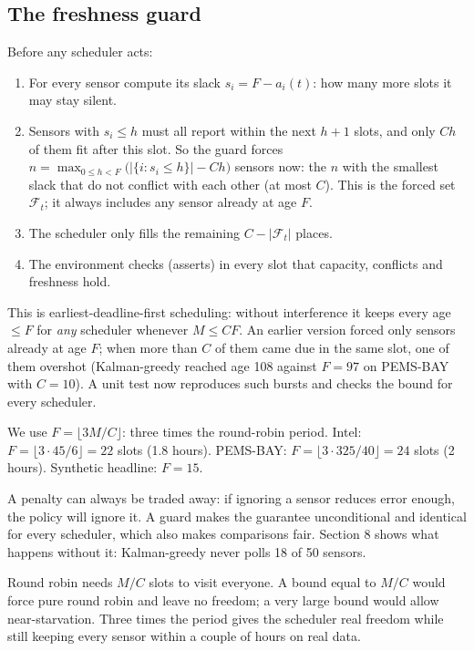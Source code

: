 \subsection{The freshness guard}

Before any scheduler acts:
\begin{enumerate}
  \item For every sensor compute its slack $s_i=F-a_i(t)$: how many more slots it may stay silent.
  \item Sensors with $s_i\le h$ must all report within the next $h+1$ slots, and only $Ch$ of them fit after this
        slot. So the guard forces $n=\max_{0\le h<F}\big(|\{i:s_i\le h\}|-Ch\big)$ sensors now: the $n$ with the
        smallest slack that do not conflict with each other (at most $C$). This is the forced set $\mathcal F_t$;
        it always includes any sensor already at age $F$.
  \item The scheduler only fills the remaining $C-|\mathcal F_t|$ places.
  \item The environment checks (asserts) in every slot that capacity, conflicts and freshness hold.
\end{enumerate}
This is earliest-deadline-first scheduling: without interference it keeps every age $\le F$ for \emph{any}
scheduler whenever $M\le CF$. An earlier version forced only sensors already at age $F$; when more than $C$ of them
came due in the same slot, one of them overshot (Kalman-greedy reached age 108 against $F=97$ on PEMS-BAY with
$C=10$). A unit test now reproduces such bursts and checks the bound for every scheduler.

We use $F=\lfloor 3M/C\rfloor$: three times the round-robin period. Intel: $F=\lfloor 3\cdot45/6\rfloor=22$ slots
(1.8 hours). PEMS-BAY: $F=\lfloor3\cdot325/40\rfloor=24$ slots (2 hours). Synthetic headline: $F=15$.

\begin{whybox}
A penalty can always be traded away: if ignoring a sensor reduces error enough, the policy will ignore it. A guard
makes the guarantee unconditional and identical for every scheduler, which also makes comparisons fair.
Section 8 shows what happens without it: Kalman-greedy never polls 18 of 50 sensors.
\end{whybox}

\begin{whybox}[Why $F = 3M/C$?]
Round robin needs $M/C$ slots to visit everyone. A bound equal to $M/C$ would force pure round robin and leave no
freedom; a very large bound would allow near-starvation. Three times the period gives the scheduler real freedom
while still keeping every sensor within a couple of hours on real data.
\end{whybox}

